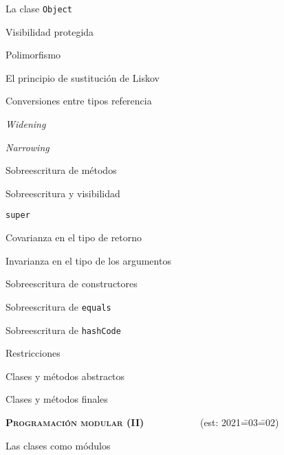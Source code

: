\begin{longenum}
\begin{longenum}
\begin{longenum}
            \item La clase \texttt{Object}
            \item Visibilidad protegida
        \end{longenum}
        \item Polimorfismo
        \begin{longenum}
            \item El principio de sustitución de Liskov
            \item Conversiones entre tipos referencia
            \begin{longenum}
                \item \textit{Widening}
                \item \textit{Narrowing}
            \end{longenum}
            \item Sobreescritura de métodos
            \begin{longenum}
                \item Sobreescritura y visibilidad
                \item \texttt{super}
                \item Covarianza en el tipo de retorno
                \item Invarianza en el tipo de los argumentos
                \item Sobreescritura de constructores
                \item Sobreescritura de \texttt{equals}
                \item Sobreescritura de \texttt{hashCode}
            \end{longenum}
        \end{longenum}
        \item Restricciones
        \begin{longenum}
            \item Clases y métodos abstractos
            \item Clases y métodos finales
        \end{longenum}
    \end{longenum}
    \item \textbf{\textsc{Programación modular (II)}} \ \ \ \ \ \ \ \ \ \ \ (est: 2021\==03\==02)
    \begin{longenum}
        \item Las clases como módulos
        \begin{longenum}

\end{longenum}
\end{longenum}
\end{longenum}
